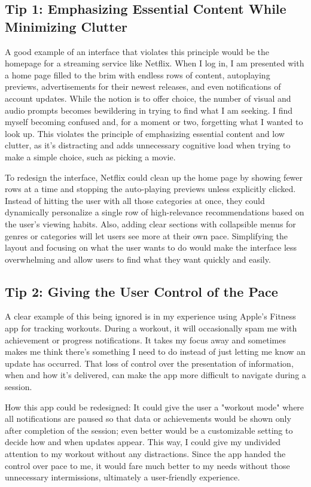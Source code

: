 \documentclass[
	letterpaper, %
]{jdf}
\begin{document}
\subsection {Tip 1: Emphasizing Essential Content While Minimizing Clutter}

A good example of an interface that violates this principle would be the homepage for a streaming service like Netflix. When I log in, I am presented with a home page filled to the brim with endless rows of content, autoplaying previews, advertisements for their newest releases, and even notifications of account updates. While the notion is to offer choice, the number of visual and audio prompts becomes bewildering in trying to find what I am seeking. I find myself becoming confused and, for a moment or two, forgetting what I wanted to look up. This violates the principle of emphasizing essential content and low clutter, as it's distracting and adds unnecessary cognitive load when trying to make a simple choice, such as picking a movie.

To redesign the interface, Netflix could clean up the home page by showing fewer rows at a time and stopping the auto-playing previews unless explicitly clicked. Instead of hitting the user with all those categories at once, they could dynamically personalize a single row of high-relevance recommendations based on the user's viewing habits. Also, adding clear sections with collapsible menus for genres or categories will let users see more at their own pace. Simplifying the layout and focusing on what the user wants to do would make the interface less overwhelming and allow users to find what they want quickly and easily.

\subsection{Tip 2: Giving the User Control of the Pace}

A clear example of this being ignored is in my experience using Apple’s Fitness app for tracking workouts. During a workout, it will occasionally spam me with achievement or progress notifications. It takes my focus away and sometimes makes me think there's something I need to do instead of just letting me know an update has occurred. That loss of control over the presentation of information, when and how it's delivered, can make the app more difficult to navigate during a session.

How this app could be redesigned: It could give the user a "workout mode" where all notifications are paused so that data or achievements would be shown only after completion of the session; even better would be a customizable setting to decide how and when updates appear. This way, I could give my undivided attention to my workout without any distractions. Since the app handed the control over pace to me, it would fare much better to my needs without those unnecessary intermissions, ultimately a user-friendly experience.
\end{document}
